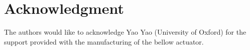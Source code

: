 \section*{Acknowledgment}\label{sec:acknowledgment}
The authors would like to acknowledge Yao Yao (University of Oxford) for the support provided with the manufacturing of the bellow actuator. 